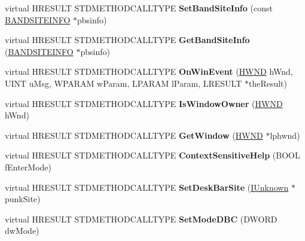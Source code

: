 \begin{DoxyCompactItemize}
virtual H\+R\+E\+S\+U\+LT S\+T\+D\+M\+E\+T\+H\+O\+D\+C\+A\+L\+L\+T\+Y\+PE {\bfseries Set\+Band\+Site\+Info} (const \hyperlink{structtag_b_a_n_d_s_i_t_e_i_n_f_o}{B\+A\+N\+D\+S\+I\+T\+E\+I\+N\+FO} $\ast$pbsinfo)
\item 
\mbox{\label{class_c_band_site_base_a01739662b822ddaaee16218232a51668}} 
virtual H\+R\+E\+S\+U\+LT S\+T\+D\+M\+E\+T\+H\+O\+D\+C\+A\+L\+L\+T\+Y\+PE {\bfseries Get\+Band\+Site\+Info} (\hyperlink{structtag_b_a_n_d_s_i_t_e_i_n_f_o}{B\+A\+N\+D\+S\+I\+T\+E\+I\+N\+FO} $\ast$pbsinfo)
\item 
\mbox{\label{class_c_band_site_base_a5886ab9da433923255f6580abdd5f685}} 
virtual H\+R\+E\+S\+U\+LT S\+T\+D\+M\+E\+T\+H\+O\+D\+C\+A\+L\+L\+T\+Y\+PE {\bfseries On\+Win\+Event} (\hyperlink{interfacevoid}{H\+W\+ND} h\+Wnd, U\+I\+NT u\+Msg, W\+P\+A\+R\+AM w\+Param, L\+P\+A\+R\+AM l\+Param, L\+R\+E\+S\+U\+LT $\ast$the\+Result)
\item 
\mbox{\label{class_c_band_site_base_ab0474c7876ed4fae7ea63682c6484488}} 
virtual H\+R\+E\+S\+U\+LT S\+T\+D\+M\+E\+T\+H\+O\+D\+C\+A\+L\+L\+T\+Y\+PE {\bfseries Is\+Window\+Owner} (\hyperlink{interfacevoid}{H\+W\+ND} h\+Wnd)
\item 
\mbox{\label{class_c_band_site_base_af93af32dcead24e7fbbb2e4f1e76c04d}} 
virtual H\+R\+E\+S\+U\+LT S\+T\+D\+M\+E\+T\+H\+O\+D\+C\+A\+L\+L\+T\+Y\+PE {\bfseries Get\+Window} (\hyperlink{interfacevoid}{H\+W\+ND} $\ast$lphwnd)
\item 
\mbox{\label{class_c_band_site_base_a423d1fb70b251bae9ac2b84de9e0dcf6}} 
virtual H\+R\+E\+S\+U\+LT S\+T\+D\+M\+E\+T\+H\+O\+D\+C\+A\+L\+L\+T\+Y\+PE {\bfseries Context\+Sensitive\+Help} (B\+O\+OL f\+Enter\+Mode)
\item 
\mbox{\label{class_c_band_site_base_a4c5c298a97b24e12cfa32a06c2f543f9}} 
virtual H\+R\+E\+S\+U\+LT S\+T\+D\+M\+E\+T\+H\+O\+D\+C\+A\+L\+L\+T\+Y\+PE {\bfseries Set\+Desk\+Bar\+Site} (\hyperlink{interface_i_unknown}{I\+Unknown} $\ast$punk\+Site)
\item 
\mbox{\label{class_c_band_site_base_acf5469005739b864f0e52e5595bea1ef}} 
virtual H\+R\+E\+S\+U\+LT S\+T\+D\+M\+E\+T\+H\+O\+D\+C\+A\+L\+L\+T\+Y\+PE {\bfseries Set\+Mode\+D\+BC} (D\+W\+O\+RD dw\+Mode)

\end{DoxyCompactItemize}
